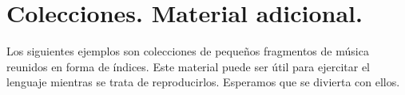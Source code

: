 \appendix
\section{Colecciones. Material adicional.}

Los siguientes ejemplos son colecciones de pequeños fragmentos de
música reunidos en forma de índices.  Este material puede ser útil
para ejercitar el lenguaje mientras se trata de
reproducirlos. Esperamos que se divierta con ellos.






